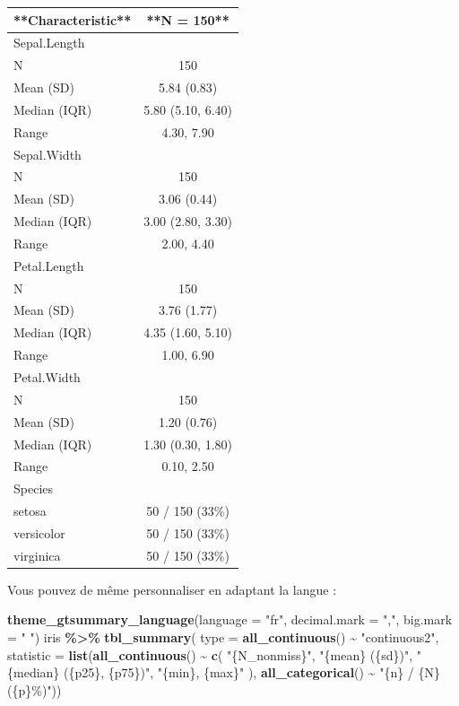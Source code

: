 \documentclass[
]{book}
\newenvironment{Shaded}{\begin{snugshade}}{\end{snugshade}}
\newcommand{\AttributeTok}[1]{\textcolor[rgb]{0.13,0.29,0.53}{#1}}
\newcommand{\FunctionTok}[1]{\textcolor[rgb]{0.13,0.29,0.53}{\textbf{#1}}}
\newcommand{\NormalTok}[1]{#1}
\newcommand{\SpecialCharTok}[1]{\textcolor[rgb]{0.81,0.36,0.00}{\textbf{#1}}}
\newcommand{\StringTok}[1]{\textcolor[rgb]{0.31,0.60,0.02}{#1}}
\begin{document}
\begin{tabular}{l|c}
\hline
**Characteristic** & **N = 150**\\
\hline
Sepal.Length & \\
\hline
N & 150\\
\hline
Mean (SD) & 5.84 (0.83)\\
\hline
Median (IQR) & 5.80 (5.10, 6.40)\\
\hline
Range & 4.30, 7.90\\
\hline
Sepal.Width & \\
\hline
N & 150\\
\hline
Mean (SD) & 3.06 (0.44)\\
\hline
Median (IQR) & 3.00 (2.80, 3.30)\\
\hline
Range & 2.00, 4.40\\
\hline
Petal.Length & \\
\hline
N & 150\\
\hline
Mean (SD) & 3.76 (1.77)\\
\hline
Median (IQR) & 4.35 (1.60, 5.10)\\
\hline
Range & 1.00, 6.90\\
\hline
Petal.Width & \\
\hline
N & 150\\
\hline
Mean (SD) & 1.20 (0.76)\\
\hline
Median (IQR) & 1.30 (0.30, 1.80)\\
\hline
Range & 0.10, 2.50\\
\hline
Species & \\
\hline
setosa & 50 / 150 (33\%)\\
\hline
versicolor & 50 / 150 (33\%)\\
\hline
virginica & 50 / 150 (33\%)\\
\hline
\end{tabular}

Vous pouvez de même personnaliser en adaptant la langue :

\begin{Shaded}
\begin{Highlighting}[]
\FunctionTok{theme\_gtsummary\_language}\NormalTok{(}\AttributeTok{language =} \StringTok{"fr"}\NormalTok{, }\AttributeTok{decimal.mark =} \StringTok{","}\NormalTok{, }\AttributeTok{big.mark =} \StringTok{" "}\NormalTok{)}
\NormalTok{iris }\SpecialCharTok{\%\textgreater{}\%}
  \FunctionTok{tbl\_summary}\NormalTok{(}
    \AttributeTok{type =} \FunctionTok{all\_continuous}\NormalTok{() }\SpecialCharTok{\textasciitilde{}} \StringTok{"continuous2"}\NormalTok{,}
    \AttributeTok{statistic =} \FunctionTok{list}\NormalTok{(}\FunctionTok{all\_continuous}\NormalTok{() }\SpecialCharTok{\textasciitilde{}} \FunctionTok{c}\NormalTok{(}
      \StringTok{"\{N\_nonmiss\}"}\NormalTok{,}
      \StringTok{"\{mean\} (\{sd\})"}\NormalTok{,}
      \StringTok{"\{median\} (\{p25\}, \{p75\})"}\NormalTok{,}
      \StringTok{"\{min\}, \{max\}"}
\NormalTok{    ), }\FunctionTok{all\_categorical}\NormalTok{() }\SpecialCharTok{\textasciitilde{}} \StringTok{"\{n\} / \{N\} (\{p\}\%)"}\NormalTok{))}
\end{Highlighting}
\end{Shaded}
\end{document}
